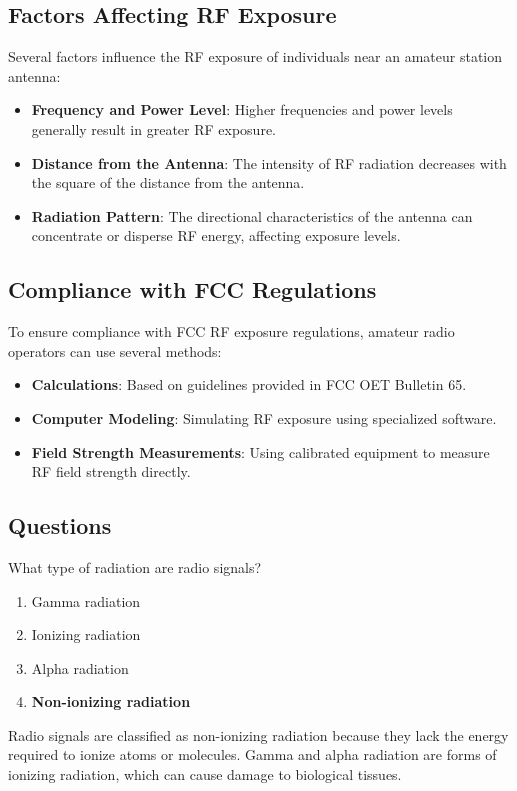 \subsection*{Factors Affecting RF Exposure}
Several factors influence the RF exposure of individuals near an amateur station antenna:
\begin{itemize}
    \item \textbf{Frequency and Power Level}: Higher frequencies and power levels generally result in greater RF exposure.
    \item \textbf{Distance from the Antenna}: The intensity of RF radiation decreases with the square of the distance from the antenna.
    \item \textbf{Radiation Pattern}: The directional characteristics of the antenna can concentrate or disperse RF energy, affecting exposure levels.
\end{itemize}

\subsection*{Compliance with FCC Regulations}
To ensure compliance with FCC RF exposure regulations, amateur radio operators can use several methods:
\begin{itemize}
    \item \textbf{Calculations}: Based on guidelines provided in FCC OET Bulletin 65.
    \item \textbf{Computer Modeling}: Simulating RF exposure using specialized software.
    \item \textbf{Field Strength Measurements}: Using calibrated equipment to measure RF field strength directly.
\end{itemize}

\subsection*{Questions}
\begin{tcolorbox}[colback=gray!10!white,colframe=black!75!black,title={T0C01}]
What type of radiation are radio signals?
\begin{enumerate}[label=\Alph*),noitemsep]
    \item Gamma radiation
    \item Ionizing radiation
    \item Alpha radiation
    \item \textbf{Non-ionizing radiation}
\end{enumerate}
\end{tcolorbox}
Radio signals are classified as non-ionizing radiation because they lack the energy required to ionize atoms or molecules. Gamma and alpha radiation are forms of ionizing radiation, which can cause damage to biological tissues.

